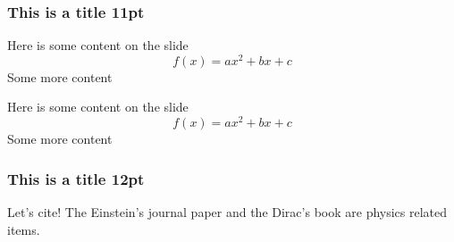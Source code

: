 \documentclass[14pt]{beamer}
\begin{document}
\begin{frame}
  \frametitle{This is a title 11pt}
  Here is some content on the slide
  \[
    f(x) = ax^2 + bx + c
  \]
  Some more content
\end{frame}

\begingroup
\small %
\begin{frame}
  Here is some content on the slide
  \[
    f(x) = ax^2 + bx + c
  \]
  Some more content
\end{frame}
\endgroup

\begin{frame}
  \frametitle{This is a title 12pt}

Let's cite! The Einstein's journal paper \cite{number} and the Dirac's 
book \cite{number} are physics related items. 
\end{frame}
\end{document}
